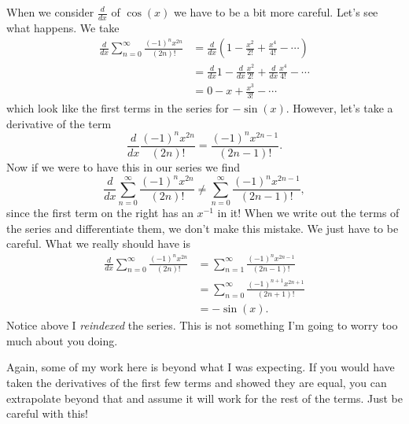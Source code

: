\documentclass[12pt]{article} %
\begin{document}
\begin{solution}
\begin{enumerate}[(a)]
    When we consider $\frac{d}{dx}$ of $\cos(x)$ we have to be a bit more careful.  Let's see what happens.  We take
    \begin{align*}
        \frac{d}{dx} \sum_{n=0}^\infty \frac{(-1)^n x^{2n}}{(2n)!} &= \frac{d}{dx} \left(1-\frac{x^2}{2!}+\frac{x^4}{4!} - \cdots \right)\\
        &= \frac{d}{dx} 1 -\frac{d}{dx} \frac{x^2}{2!} +\frac{d}{dx} \frac{x^4}{4!} - \cdots\\
        &= 0 - x +\frac{x^3}{3!} - \cdots
    \end{align*}
    which look like the first terms in the series for $-\sin(x)$. However, let's take a derivative of the term
    \[
    \frac{d}{dx} \frac{(-1)^n x^{2n}}{(2n)!} = \frac{(-1)^n x^{2n-1}}{(2n-1)!}.
    \]
    Now if we were to have this in our series we find
    \[
        \frac{d}{dx} \sum_{n=0}^\infty \frac{(-1)^n x^{2n}}{(2n)!} \not=  \sum_{n=0}^\infty \frac{(-1)^n x^{2n-1}}{(2n-1)!},
    \]
    since the first term on the right has an $x^{-1}$ in it! When we write out the terms of the series and differentiate them, we don't make this mistake.  We just have to be careful.  What we really should have is
    \begin{align*}
                \frac{d}{dx} \sum_{n=0}^\infty \frac{(-1)^n x^{2n}}{(2n)!} &=  \sum_{n=1}^\infty \frac{(-1)^n x^{2n-1}}{(2n-1)!}\\
                &=\sum_{n=0}^\infty \frac{(-1)^{n+1} x^{2n+1}}{(2n+1)!}\\
                &= -\sin(x).
    \end{align*}
    Notice above I \emph{reindexed} the series.  This is not something I'm going to worry too much about you doing.
\end{enumerate}
\end{solution}
\begin{remark}
Again, some of my work here is beyond what I was expecting. If you would have taken the derivatives of the first few terms and showed they are equal, you can extrapolate beyond that and assume it will work for the rest of the terms.  Just be careful with this!
\end{remark}
\end{document}
